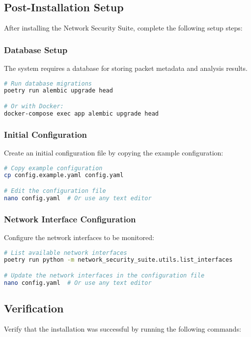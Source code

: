 \subsection{Post-Installation Setup}
After installing the Network Security Suite, complete the following setup steps:

\subsubsection{Database Setup}
The system requires a database for storing packet metadata and analysis results.

\begin{lstlisting}[language=bash, caption=Database Setup]
# Run database migrations
poetry run alembic upgrade head

# Or with Docker:
docker-compose exec app alembic upgrade head
\end{lstlisting}

\subsubsection{Initial Configuration}
Create an initial configuration file by copying the example configuration:

\begin{lstlisting}[language=bash, caption=Initial Configuration]
# Copy example configuration
cp config.example.yaml config.yaml

# Edit the configuration file
nano config.yaml  # Or use any text editor
\end{lstlisting}

\subsubsection{Network Interface Configuration}
Configure the network interfaces to be monitored:

\begin{lstlisting}[language=bash, caption=Network Interface Configuration]
# List available network interfaces
poetry run python -m network_security_suite.utils.list_interfaces

# Update the network interfaces in the configuration file
nano config.yaml  # Or use any text editor
\end{lstlisting}

\subsection{Verification}
Verify that the installation was successful by running the following commands:

